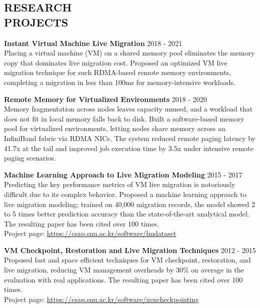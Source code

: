 \documentclass[margin]{res}
\begin{document}
\begin{resume}
\section{RESEARCH \\ PROJECTS}
\par
\textbf{Instant Virtual Machine Live Migration} \hfill 2018 - 2021 \\
Placing a virtual machine (VM) on a shared memory pool eliminates the memory copy
that dominates live migration cost. Proposed an optimized VM live migration
technique for such RDMA-based remote memory environments, completing a migration
in less than 100ms for memory-intensive workloads.

\vspace{-0.5em}
\par
\textbf{Remote Memory for Virtualized Environments} \hfill 2018 - 2020 \\
Memory fragmentation across nodes leaves capacity unused, and a workload that does
not fit in local memory falls back to disk. Built a software-based memory pool for
virtualized environments, letting nodes share memory across an InfiniBand fabric
via RDMA NICs. The system reduced remote paging latency by 41.7x at the tail and
improved job execution time by 3.5x under intensive remote paging scenarios.

\vspace{-0.5em}
\par
\textbf{Machine Learning Approach to Live Migration Modeling} \hfill 2015 - 2017 \\
Predicting the key performance metrics of VM live migration is notoriously
difficult due to its complex behavior. Proposed a machine learning approach to
live migration modeling; trained on 40,000 migration records, the model showed
2 to 5 times better prediction accuracy than the state-of-the-art analytical
model.
The resulting paper has been cited over 100 times.
\\
Project page: \href{https://csap.snu.ac.kr/software/lmdataset}{https://csap.snu.ac.kr/software/lmdataset}

\vspace{-0.5em}
\par
\textbf{VM Checkpoint, Restoration and Live Migration Techniques} \hfill 2012 - 2015 \\
Proposed fast and space efficient techniques for VM checkpoint, restoration,
and live migration, reducing VM management overheads by 30\% on average in the
evaluation with real applications.
The resulting paper has been cited over 100 times. \\
Project page: \href{https://csap.snu.ac.kr/software/xencheckpointing}{https://csap.snu.ac.kr/software/xencheckpointing}


\end{resume}
\end{document}
